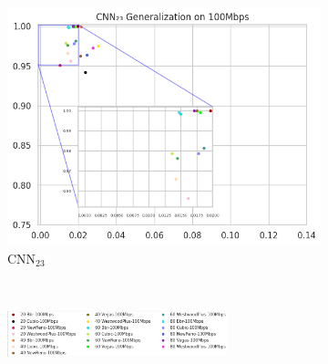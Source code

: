 \documentclass[a4paper,fleqn]{cas-sc}
\begin{document}
\begin{figure}[h!]
\begin{minipage}[t]{0.46\textwidth}
\begin{subfigure}[t]{0.33\textwidth}
				\includegraphics[draft=false, width=\textwidth]{./figs/Generalizacao-CNN23-100Mbps.png} 
				\caption{CNN$_{23}$}
				\label{fig:Generalizacao-CNN23-100Mbps}
			\end{subfigure}%
			~
			
			\begin{subfigure}[t]{\textwidth}
				\centering
				\includegraphics[draft=false, width=0.7\textwidth]{./figs/legenta_100Mbps.png} 
				\label{fig:legenda-10Mbps}
			\end{subfigure}%
			~
		\hfill
		\caption{Models generalization capacity, on 100Mbps.\hspace{8.5cm}}
		\label{fig:Generalizacao-100Mbps}
	\end{minipage}
	\hfill
	\begin{minipage}[t]{0.46\textwidth} %
	\centering
	\vspace{0.5cm}
	
		\begin{subfigure}[t]{0.33\textwidth}
			

\end{subfigure}
\end{minipage}
\end{figure}
\end{document}
